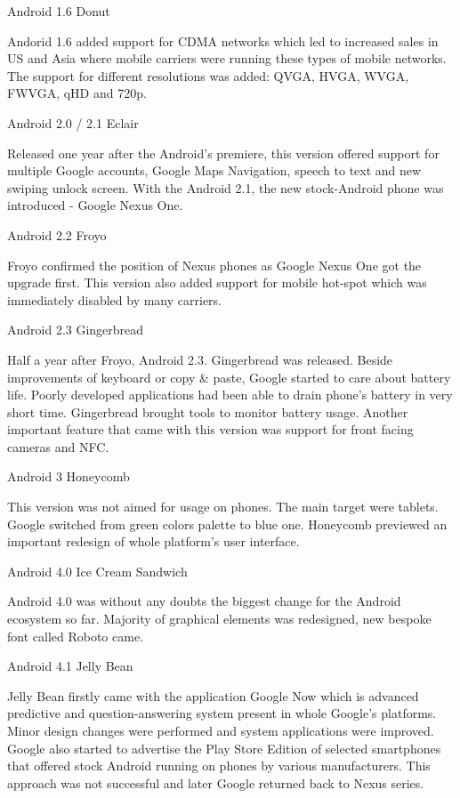 \seccc Android 1.6 Donut

Andorid 1.6 added support for CDMA networks which led to increased sales in US and Asia where mobile carriers were running these types of mobile networks. The support for different resolutions was added: QVGA, HVGA, WVGA, FWVGA, qHD and 720p. 

\seccc Android 2.0 / 2.1 Eclair

Released one year after the Android's premiere, this version offered support for multiple Google accounts, Google Maps Navigation, speech to text and new swiping unlock screen. With the Android 2.1, the new stock-Android phone was introduced  - Google Nexus One. 

\seccc Android 2.2 Froyo

Froyo confirmed the position of Nexus phones as Google Nexus One got the upgrade first. This version also added support for mobile hot-spot which was immediately disabled by many carriers. 

\seccc Android 2.3 Gingerbread

Half a year after Froyo, Android 2.3. Gingerbread was released. Beside improvements of keyboard or copy \& paste, Google started to care about battery life. Poorly developed applications had been able to drain phone's battery in very short time. Gingerbread brought tools to monitor battery usage. Another important feature that came with this version was support for front facing cameras and NFC.

\seccc Android 3 Honeycomb

This version was not aimed for usage on phones. The main target were tablets. Google switched from green colors palette to blue one. Honeycomb previewed an important redesign of whole platform's user interface.

\seccc Android 4.0 Ice Cream Sandwich

Android 4.0 was without any doubts the biggest change for the Android ecosystem so far. Majority of graphical elements was redesigned, new bespoke font called Roboto came. 

\seccc Android 4.1 Jelly Bean

Jelly Bean firstly came with the application Google Now which is advanced predictive and question-answering system present in whole Google's platforms. Minor design changes were performed and system applications were improved. Google also started to advertise the Play Store Edition of selected smartphones that offered stock Android running on phones by various manufacturers. This approach was not successful and later Google returned back to Nexus series.

